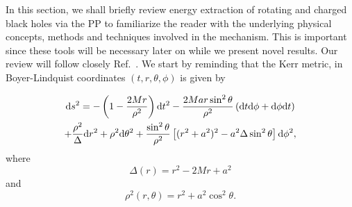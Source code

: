 In this section, we shall briefly review energy extraction of rotating and charged black holes via the PP to familiarize the reader with the underlying physical concepts, methods and techniques involved in the mechanism. This is important since these tools will be necessary later on while we present novel results. Our review will follow closely Ref.~\cite{carroll}. We start by reminding that the Kerr metric, in Boyer-Lindquist coordinates $(t, r, \theta, \phi)$ is given by

\begin{multline}
  \mathrm{d} s^2 = -\left(1 - \frac{2 M r}{\rho^2}\right)\mathrm{d} t^2 - \frac{2 M a r \sin^2\theta}{\rho^2}\left( \mathrm{d} t \mathrm{d} \phi + \mathrm{d} \phi \mathrm{d} t \right)\\
  + \frac{\rho^2}{\Delta} \mathrm{d} r^2 + \rho^2 \mathrm{d}\theta^2 + \frac{\sin^2\theta}{\rho^2}\left[ (r^2 + a^2)^2 - a^2\Delta\sin^2\theta \right]\mathrm{d}\phi^2,
  \label{eq:kerr_penrose_review_kerr_metric}
\end{multline}
%
where
%
\begin{equation}
  \Delta(r) = r^2 - 2Mr + a^2
  \label{eq:kerr_penrose_review_kerr_delta}
\end{equation}
%
and
%
\begin{equation}
  \rho^2(r, \theta) = r^2 + a^2\cos^2\theta.
  \label{eq:kerr_penrose_review_kerr_rho}
\end{equation}

